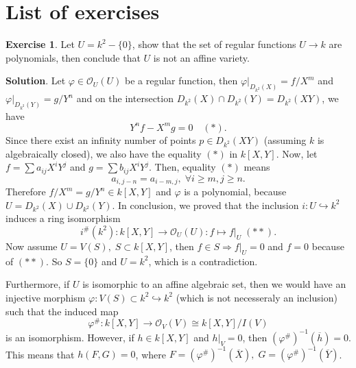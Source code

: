 \chapter{List of exercises}

\begin{dang}
\textbf{Exercise 1}. Let $U=k^2-\{0\}$, show that the set of regular functions $U\to k$ are polynomials, then 
conclude that $U$ is not an affine variety.    
\end{dang}
\textbf{Solution}. Let $\varphi\in\mathcal{O}_U(U)$ be a regular function, then 
$\varphi|_{D_{k^2}(X)}=f/X^m$ and $\varphi|_{D_{k^2}(Y)}=g/Y^n$ and on the intersection $D_{k^2}(X)\cap D_{k^2}(Y)=D_{k^2}(XY)$, we have 
\begin{equation}
    Y^nf - X^mg = 0\quad(*).
\end{equation}
Since there exist an infinity number of points $p\in D_{k^2}(XY)$ (assuming $k$ is algebraically closed), 
we also have the equality $(*)$ in $k[X,Y]$. Now, let $f=\sum a_{ij}X^iY^j$ and 
$g=\sum b_{ij} X^iY^j$. Then, equality $(*)$ means 
\begin{equation}
    a_{i, j-n} = a_{i-m,j},\;\forall i\geq m, j\geq n.
\end{equation}  
Therefore $f/X^m = g/Y^n\in k[X,Y]$ and $\varphi$ is a polynomial, because $U=D_{k^2}(X)\cup D_{k^2}(Y)$. In conclusion,
we proved that the inclusion $i:U\hookrightarrow k^2$ induces a ring isomorphism
\begin{equation}
    i^\#(k^2): k[X,Y]\to \mathcal{O}_U(U):f\mapsto f|_U\; (**).
\end{equation}
Now assume $U=V(S),\;S\subset k[X,Y]$, then $f\in S\Rightarrow f|_U=0$ and $f=0$ because of $(**)$. So 
$S=\{0\}$ and $U=k^2$, which is a contradiction.\par  

Furthermore, if $U$ is isomorphic to an affine 
algebraic set, then we would have an injective morphism $\varphi:V(S)\subset k^2\hookrightarrow k^2$ (which is 
not necesseraly an inclusion) such that the induced map 
\begin{equation}
    \varphi^\#:k[X,Y]\to\mathcal{O}_V(V)\cong k[X,Y]/I(V)
\end{equation}
is an isomorphism. However, if $h\in k[X,Y]$ and $h|_V=0$, then $(\varphi^\#)^{-1}(\overline{h})=0$. This means that 
$h(F,G)=0$, where $F=(\varphi^\#)^{-1}(\overline{X}),\; G = (\varphi^\#)^{-1}(\overline{Y})$.




